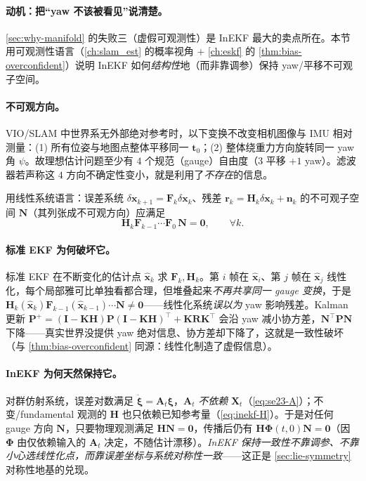 \paragraph{动机：把“yaw 不该被看见”说清楚。}
\cref{sec:why-manifold} 的失败三（虚假可观测性）是 InEKF 最大的卖点所在。本节用可观测性语言（\cref{ch:slam_est} 的概率视角 $+$ \cref{ch:eskf} 的 \cref{thm:bias-overconfident}）说明 InEKF 如何\emph{结构性}地（而非靠调参）保持 yaw/平移不可观子空间。

\paragraph{不可观方向。}VIO/SLAM 中世界系无外部绝对参考时，以下变换不改变相机图像与 IMU 相对测量：(1) 所有位姿与地图点整体平移同一 $\mathbf{t}_0$；(2) 整体绕重力方向旋转同一 yaw 角 $\psi$。故理想估计问题至少有 $4$ 个规范（gauge）自由度（$3$ 平移 $+1$ yaw）。滤波器若声称这 $4$ 方向不确定性变小，就是利用了\emph{不存在}的信息。

用线性系统语言：误差系统 $\delta\mathbf{x}_{k+1}=\mathbf{F}_k\delta\mathbf{x}_k$、残差 $\mathbf{r}_k=\mathbf{H}_k\delta\mathbf{x}_k+\mathbf{n}_k$ 的不可观子空间 $\mathbf{N}$（其列张成不可观方向）应满足
\begin{equation}
  \mathbf{H}_k\mathbf{F}_{k-1}\cdots\mathbf{F}_0\,\mathbf{N}=\mathbf{0},\qquad\forall k.
  \label{eq:obs-null}
\end{equation}

\paragraph{标准 EKF 为何破坏它。}标准 EKF 在不断变化的估计点 $\hat{\mathbf{x}}_k$ 求 $\mathbf{F}_k,\mathbf{H}_k$。第 $i$ 帧在 $\hat{\mathbf{x}}_i$、第 $j$ 帧在 $\hat{\mathbf{x}}_j$ 线性化，每个局部雅可比单独看都合理，但堆叠起来\emph{不再共享同一 gauge 变换}，于是 $\mathbf{H}_k(\hat{\mathbf{x}}_k)\mathbf{F}_{k-1}(\hat{\mathbf{x}}_{k-1})\cdots\mathbf{N}\neq\mathbf{0}$——线性化系统\emph{误以为} yaw 影响残差。Kalman 更新 $\mathbf{P}^+=(\mathbf{I}-\mathbf{K}\mathbf{H})\mathbf{P}(\mathbf{I}-\mathbf{K}\mathbf{H})^\top+\mathbf{K}\mathbf{R}\mathbf{K}^\top$ 会沿 yaw 减小协方差，$\mathbf{N}^\top\mathbf{P}\mathbf{N}$ 下降——真实世界没提供 yaw 绝对信息、协方差却下降了，这就是一致性破坏（与 \cref{thm:bias-overconfident} 同源：线性化制造了虚假信息）。

\paragraph{InEKF 为何天然保持它。}对群仿射系统，误差对数满足 $\dot{\boldsymbol{\xi}}=\mathbf{A}_t\boldsymbol{\xi}$，$\mathbf{A}_t$ \emph{不依赖} $\hat{\mathbf{X}}_t$（\cref{eq:se23-A}）；不变/fundamental 观测的 $\mathbf{H}$ 也只依赖已知参考量（\cref{eq:inekf-H}）。于是对任何 gauge 方向 $\mathbf{N}$，只要物理观测满足 $\mathbf{H}\mathbf{N}=\mathbf{0}$，传播后仍有 $\mathbf{H}\boldsymbol{\Phi}(t,0)\mathbf{N}=\mathbf{0}$（因 $\boldsymbol{\Phi}$ 由仅依赖输入的 $\mathbf{A}_t$ 决定，不随估计漂移）。\emph{InEKF 保持一致性不靠调参、不靠小心选线性化点，而靠误差坐标与系统对称性一致}\cite{barrau2017invariant,hartley2020contact}——这正是 \cref{sec:lie-symmetry} 对称性地基的兑现。

